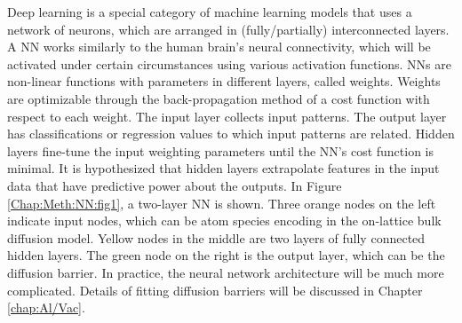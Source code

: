 Deep learning is a special category of machine learning models that uses a network of neurons, which are arranged in (fully/partially) interconnected layers. A \ac{NN} works similarly to the human brain’s neural connectivity, which will be activated under certain circumstances using various activation functions. \ac{NN}s are non-linear functions with parameters in different layers, called weights. Weights are optimizable through the back-propagation method of a cost function with respect to each weight. The input layer collects input patterns. The output layer has classifications or regression values to which input patterns are related. Hidden layers fine-tune the input weighting parameters until the \ac{NN}’s cost function is minimal. It is hypothesized that hidden layers extrapolate features in the input data that have predictive power about the outputs. In Figure \ref{Chap:Meth:NN:fig1}, a two-layer \ac{NN} is shown. Three orange nodes on the left indicate input nodes, which can be atom species encoding in the on-lattice bulk diffusion model. Yellow nodes in the middle are two layers of fully connected hidden layers. The green node on the right is the output layer, which can be the diffusion barrier. In practice, the neural network architecture will be much more complicated. Details of fitting diffusion barriers will be discussed in Chapter \ref{chap:Al/Vac}.
